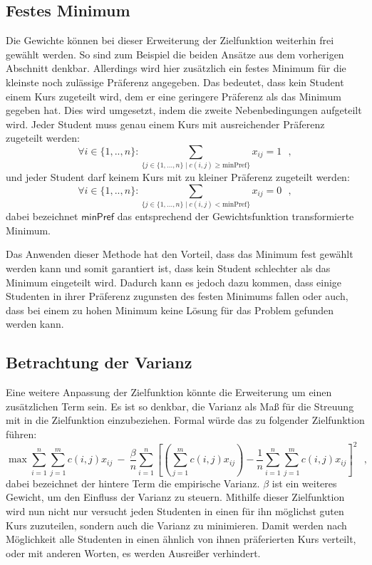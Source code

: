         \subsection{Festes Minimum}
            Die Gewichte können bei dieser Erweiterung der Zielfunktion weiterhin frei gewählt werden. 
            So sind zum Beispiel die beiden Ansätze aus dem vorherigen Abschnitt denkbar.
            Allerdings wird hier zusätzlich ein festes Minimum für die kleinste noch zulässige Präferenz angegeben.
            Das bedeutet, dass kein Student einem Kurs zugeteilt wird, dem er eine geringere Präferenz als das Minimum gegeben hat.
            Dies wird umgesetzt, indem die zweite Nebenbedingungen aufgeteilt wird.
            Jeder Student muss genau einem Kurs mit ausreichender Präferenz zugeteilt werden:
            $$ \forall {i \in \{1,..,n\}}: \sum_{\{j \in \{1, \dots, n\} \mid c(i,j) \geq \text{minPref}\}} x_{ij} = 1 ~~~,$$
            und jeder Student darf keinem Kurs mit zu kleiner Präferenz zugeteilt werden:
            $$ \forall {i \in \{1,..,n\}}: \sum_{\{j \in \{1, \dots, n\} \mid c(i,j) < \text{minPref}\}} x_{ij} = 0 ~~~,$$
            dabei bezeichnet $ \textsf{minPref} $ das entsprechend der Gewichtsfunktion transformierte Minimum.
            
            Das Anwenden dieser Methode hat den Vorteil, dass das Minimum fest gewählt werden kann und somit garantiert ist, dass kein Student schlechter als das Minimum eingeteilt wird.
            Dadurch kann es jedoch dazu kommen, dass einige Studenten in ihrer Präferenz zugunsten des festen Minimums fallen oder auch, dass bei einem zu hohen Minimum keine Lösung für das Problem gefunden werden kann.
            
        
        \subsection{Betrachtung der Varianz}
            Eine weitere Anpassung der Zielfunktion könnte die Erweiterung um einen zusätzlichen Term sein.
            Es ist so denkbar, die Varianz als Maß für die Streuung mit in die Zielfunktion einzubeziehen.
            Formal würde das zu folgender Zielfunktion führen:
                $$ \max \sum_{i=1}^{n} \sum_{j=1}^{m} c(i,j)x_{ij} 
                                ~-~ \frac{\beta}{n} \sum_{i=1}^{n}
                                    \left[\left(\sum_{j=1}^{m} c(i,j)x_{ij}\right) - \frac{1}{n} \sum_{i=1}^{n} \sum_{j=1}^{m} c(i,j)x_{ij}\right]^2 ~~~,$$
            dabei bezeichnet der hintere Term die empirische Varianz. $ \beta $ ist ein weiteres Gewicht, um den Einfluss der Varianz zu steuern.
            Mithilfe dieser Zielfunktion wird nun nicht nur versucht jeden Studenten in einen für ihn möglichst guten Kurs zuzuteilen, sondern auch die Varianz zu minimieren.
            Damit werden nach Möglichkeit alle Studenten in einen ähnlich von ihnen präferierten Kurs verteilt, oder mit anderen Worten, es werden Ausreißer verhindert.\\
            
